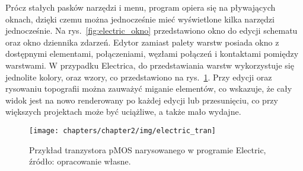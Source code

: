 Prócz stałych pasków narzędzi i menu, program opiera się na pływających oknach,
dzięki czemu można jednocześnie mieć wyświetlone kilka narzędzi jednocześnie.
Na rys.~\ref{fig:electric_okno} przedstawiono okno do edycji schematu oraz okno dziennika zdarzeń.
Edytor zamiast palety warstw posiada okno z dostępnymi elementami, połączeniami, węzłami połączeń
i kontaktami pomiędzy warstwami.\linebreak
W przypadku Electrica, do przedstawiania warstw wykorzystuje się jednolite kolory, oraz wzory,
co przedstawiono na rys.~\ref{fig:electric_tran}.
Przy edycji oraz rysowaniu topografii można zauważyć miganie elementów,
co wskazuje, że cały widok jest na nowo renderowany po każdej edycji lub przesunięciu,
co przy większych projektach może być uciążliwe, a także mało wydajne.

\begin{figure}[h]
    \centering
    \texttt{[image: chapters/chapter2/img/electric\_tran]}
    \caption[Przykład tranzystora pMOS narysowanego w programie Electric]
    {
        Przykład tranzystora pMOS narysowanego w programie Electric,
        źródło: opracowanie własne.
    }
    \label{fig:electric_tran}
\end{figure}
